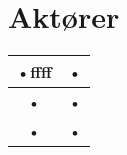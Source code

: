 \section{Aktører}
\begin{tabular}{|c|c|}
\hline 
•ffff & • \\ 
\hline 
• & • \\ 
\hline 
• & • \\ 
\hline 
\end{tabular} 


